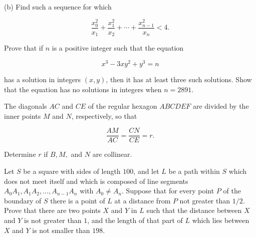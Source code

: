 \documentclass[12pt]{article}
\begin{document}
\noindent
(b) Find such a sequence for which

$$
\frac{x_0^2}{x_1}+\frac{x_1^2}{x_2}+\cdots+
\frac{x_{n-1}^2}{x_n}<4.
$$

\vspace{0.3cm}

\noindent
{}
Prove that if $n$ is a positive integer such that the equation

$$
x^3-3xy^2+y^3=n
$$

\noindent
has a solution in integers $(x,y)$, then it has at least three
such solutions. Show that the equation has no solutions in
integers when $n=2891$.

\vspace{0.1cm}

\noindent
{}
The diagonals $AC$ and $CE$ of the regular hexagon
$ABCDEF$ are divided by the inner points $M$ and $N$,
respectively, so that

$$
\frac{AM}{AC}=\frac{CN}{CE}=r.
$$

\noindent
Determine $r$ if $B,M,$ and $N$ are collinear.

\vspace{1.5cm}

\noindent
{}
Let $S$ be a square with sides of length $100$, and let $L$
be a path within $S$ which does not meet itself and which is
composed of line segments $A_0A_1,A_1A_2,\ldots,A_{n-1}A_n$
with $A_0\ne A_n$. Suppose that for every point $P$ of the
boundary of $S$ there is a point of $L$ at a distance from $P$
not greater than $1/2$. Prove that there are two points $X$
and $Y$ in $L$ such that the distance between $X$ and $Y$
is not greater than $1$, and the length of that part of $L$
which lies between $X$ and $Y$ is not smaller than $198$.
\end{document}
